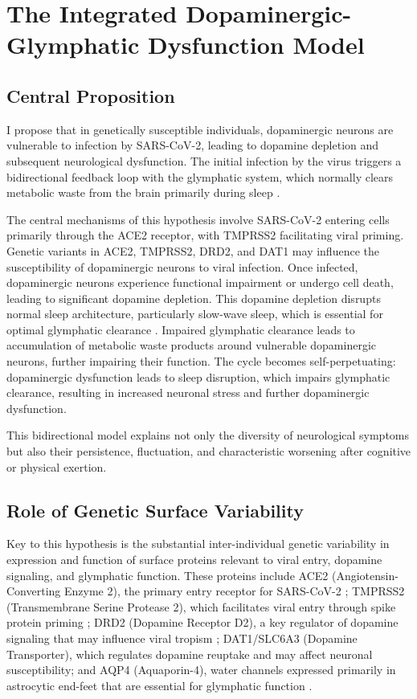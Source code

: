 \documentclass[12pt]{article}
\begin{document}
\section{The Integrated Dopaminergic-Glymphatic Dysfunction Model}

\subsection*{Central Proposition}

I propose that in genetically susceptible individuals, dopaminergic neurons are vulnerable to infection by SARS-CoV-2, leading to dopamine depletion and subsequent neurological dysfunction. The initial infection by the virus triggers a bidirectional feedback loop with the glymphatic system, which normally clears metabolic waste from the brain primarily during sleep \citep{Xie2013}. 

The central mechanisms of this hypothesis involve SARS-CoV-2 entering cells primarily through the ACE2 receptor, with TMPRSS2 facilitating viral priming. Genetic variants in ACE2, TMPRSS2, DRD2, and DAT1 may influence the susceptibility of dopaminergic neurons to viral infection. Once infected, dopaminergic neurons experience functional impairment or undergo cell death, leading to significant dopamine depletion. This dopamine depletion disrupts normal sleep architecture, particularly slow-wave sleep, which is essential for optimal glymphatic clearance \citep{Hablitz2019}. Impaired glymphatic clearance leads to accumulation of metabolic waste products around vulnerable dopaminergic neurons, further impairing their function. The cycle becomes self-perpetuating: dopaminergic dysfunction leads to sleep disruption, which impairs glymphatic clearance, resulting in increased neuronal stress and further dopaminergic dysfunction.

This bidirectional model explains not only the diversity of neurological symptoms but also their persistence, fluctuation, and characteristic worsening after cognitive or physical exertion.

\subsection*{Role of Genetic Surface Variability}

Key to this hypothesis is the substantial inter-individual genetic variability in expression and function of surface proteins relevant to viral entry, dopamine signaling, and glymphatic function. These proteins include ACE2 (Angiotensin-Converting Enzyme 2), the primary entry receptor for SARS-CoV-2 \citep{cao2020ace2genetics, hou2021ace2variants}; TMPRSS2 (Transmembrane Serine Protease 2), which facilitates viral entry through spike protein priming \citep{asselta2020ace2tmprss2}; DRD2 (Dopamine Receptor D2), a key regulator of dopamine signaling that may influence viral tropism \citep{eisenstein2016drd2}; DAT1/SLC6A3 (Dopamine Transporter), which regulates dopamine reuptake and may affect neuronal susceptibility; and AQP4 (Aquaporin-4), water channels expressed primarily in astrocytic end-feet that are essential for glymphatic function \citep{Mestre2018}.
\end{document}
